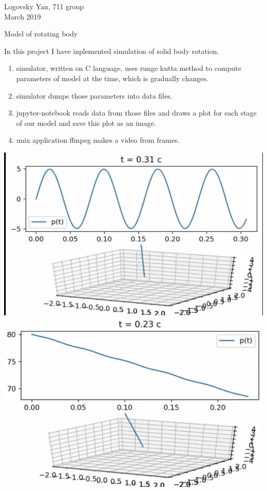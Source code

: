 \documentclass[a4paper,12pt]{article}
\begin{document}

Logovsky Yan, 711 group\\
March 2019

\begin{center}
Model of rotating body
\end{center}

In this project I have inplemented simulation of solid body rotation.\\
\begin{enumerate}
\item simulator, written on C language, uses runge kutta method to compute parameters of model at the time, which is gradually changes.
\item simulator dumps those parameters into data files.
\item jupyter-notebook reads data from those files and draws a plot for each stage of our model and save this plot as an image.
\item unix application ffmpeg makes a video from frames.
\end{enumerate}

\includegraphics[width = 0.5 \textwidth]{euler_case_regular}
\includegraphics[width = 0.5 \textwidth]{euler_case_dissip}
\end{document}
